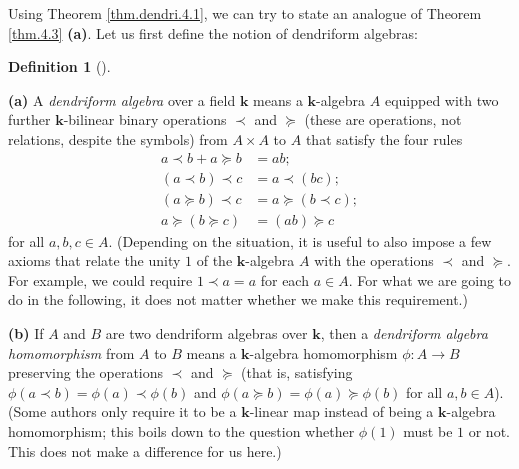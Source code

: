\documentclass[numbers=enddot,12pt,final,onecolumn,notitlepage]{scrartcl}%
\theoremstyle{definition}
\newtheorem{defi}[theo]{Definition}
\newenvironment{definition}[1][]
{\begin{defi}[#1]\begin{leftbar}}
{\end{leftbar}\end{defi}}
\begin{document}
Using Theorem \ref{thm.dendri.4.1}, we can try to state an analogue of Theorem
\ref{thm.4.3} \textbf{(a)}. Let us first define the notion of dendriform algebras:

\begin{definition}
\textbf{(a)} A \textit{dendriform algebra} over a field $\mathbf{k}$ means a
$\mathbf{k}$-algebra $A$ equipped with two further $\mathbf{k}$-bilinear
binary operations $\left.  \prec\right.  $ and $\left.  \succeq\right.  $
(these are operations, not relations, despite the symbols) from $A\times A$ to
$A$ that satisfy the four rules%
\begin{align*}
a\left.  \prec\right.  b+a\left.  \succeq\right.  b  &  =ab;\\
\left(  a\left.  \prec\right.  b\right)  \left.  \prec\right.  c  &  =a\left.
\prec\right.  \left(  bc\right)  ;\\
\left(  a\left.  \succeq\right.  b\right)  \left.  \prec\right.  c  &
=a\left.  \succeq\right.  \left(  b\left.  \prec\right.  c\right)  ;\\
a\left.  \succeq\right.  \left(  b\left.  \succeq\right.  c\right)   &
=\left(  ab\right)  \left.  \succeq\right.  c
\end{align*}
for all $a,b,c\in A$. (Depending on the situation, it is useful to also impose
a few axioms that relate the unity $1$ of the $\mathbf{k}$-algebra $A$ with
the operations $\left.  \prec\right.  $ and $\left.  \succeq\right.  $. For
example, we could require $1\left.  \prec\right.  a=a$ for each $a\in A$. For
what we are going to do in the following, it does not matter whether we make
this requirement.)

\textbf{(b)} If $A$ and $B$ are two dendriform algebras over $\mathbf{k}$,
then a \textit{dendriform algebra homomorphism} from $A$ to $B$ means a
$\mathbf{k}$-algebra homomorphism $\phi:A\rightarrow B$ preserving the
operations $\left.  \prec\right.  $ and $\left.  \succeq\right.  $ (that is,
satisfying $\phi\left(  a\left.  \prec\right.  b\right)  =\phi\left(
a\right)  \left.  \prec\right.  \phi\left(  b\right)  $ and $\phi\left(
a\left.  \succeq\right.  b\right)  =\phi\left(  a\right)  \left.
\succeq\right.  \phi\left(  b\right)  $ for all $a,b\in A$). (Some authors
only require it to be a $\mathbf{k}$-linear map instead of being a
$\mathbf{k}$-algebra homomorphism; this boils down to the question whether
$\phi\left(  1\right)  $ must be $1$ or not. This does not make a difference
for us here.)
\end{definition}
\end{document}
